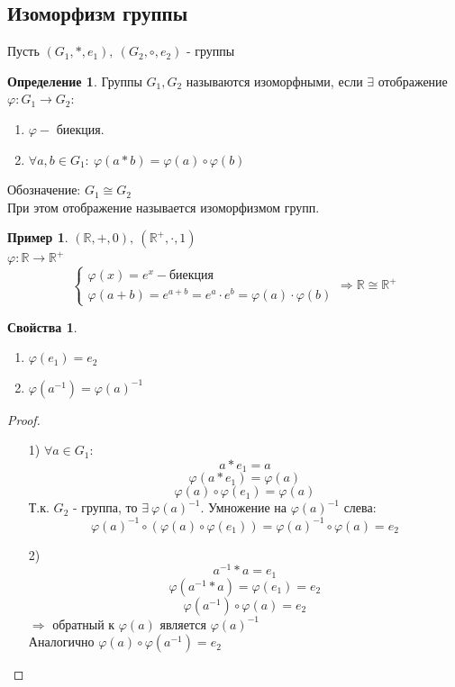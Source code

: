 \documentclass[a4paper, 12pt]{article}
\newcommand{\R}{\mathbb R}
\renewcommand{\phi}{\varphi}
\newcommand\tab[1][.5cm]{\hspace*{#1}}
\theoremstyle{definition}
\newtheorem*{definition}{Определение}
\newtheorem*{example1}{Пример}
\newtheorem*{properties}{Свойства}
\begin{document}
  \subsection{Изоморфизм группы}
  Пусть $(G_1, *, e_1), \ (G_2, \circ, e_2)$  - группы
  \begin{definition}
    Группы $G_1, G_2$ называются изоморфными, если $\exists $ отображение $\phi: G_1 \to G_2: $
    \begin{enumerate}
      \item $\phi - $ биекция. 
      \item $\forall a,b \in G_1: \ \phi(a*b) = \phi(a)\circ\phi(b)$  
    \end{enumerate}
  Обозначение: $G_1\cong G_2$ \\
  При этом отображение называется изоморфизмом групп.  
  \end{definition} 
  \begin{example1}
    $(\R, +, 0), \ (\R^{+}, \cdot, 1)$ \\
    $\phi:\R \to \R^{+}$
    $$\begin{cases}
    \phi(x) = e^x - \text{биекция}\\
    \phi(a+b) = e^{a+b} = e^a \cdot e^b = \phi(a) \cdot \phi(b)
  \end{cases} \Longrightarrow \R \cong \R^+ $$
  \end{example1}
  \begin{properties} \tab
    \begin{enumerate}
      \item $\phi(e_1) = e_2$
      \item $\phi(a^{-1}) = \phi(a)^{-1}$  
    \end{enumerate}
  \end{properties}
  \begin{proof} \tab
    \begin{itemize}
      \item[1)] $\forall a \in G_1:$ $$a * e_1 = a$$ 
      $$\phi(a*e_1) = \phi(a)$$ 
      $$\phi(a) \circ \phi(e_1) = \phi(a)$$
      Т.к. $G_2$ - группа, то $\exists \ \phi(a)^{-1}$. Умножение на $\phi(a)^{-1}$ слева: $$\phi(a)^{-1} \circ (\phi(a) \circ \phi(e_1)) = \phi(a)^{-1} \circ \phi(a) = e_2$$
      \item[2)] $$a^{-1} * a = e_1$$
      $$\phi(a^{-1} * a) = \phi(e_1)= e_2$$
    $$\phi(a^{-1}) \circ \phi(a) = e_2$$
    $\Longrightarrow $ обратный к $\phi(a)$ является $\phi(a)^{-1}$ \\
    Аналогично $\phi(a) \circ \phi(a^{-1}) = e_2$     
    \end{itemize}
  \end{proof} 
\end{document}
